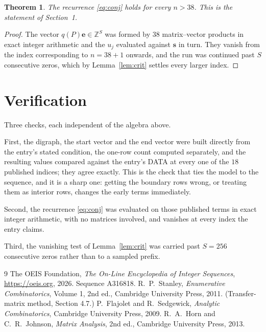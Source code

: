 \documentclass[11pt,a4paper]{article}
\theoremstyle{plain}
\newtheorem{theorem}{Theorem}
\theoremstyle{definition}
\begin{document}
\begin{theorem}
The recurrence \eqref{eq:conj} holds for every $n>38$. This is the statement of
Section~1.
\end{theorem}

\begin{proof}
The vector $q(P)\mathbf{e}\in\mathbb{Z}^{S}$ was formed by $38$ matrix--vector
products in exact integer arithmetic and the $u_j$ evaluated against $\mathbf{s}$ in turn.
They vanish from the index corresponding to $n=38+1$ onwards, and the run was continued
past $S$ consecutive zeros, which by Lemma~\ref{lem:crit} settles every larger index.
\end{proof}

\section{Verification}

Three checks, each independent of the algebra above.

First, the digraph, the start vector and the end vector were built directly from the
entry's stated condition, the one-row count computed separately, and the resulting values
compared against the entry's DATA at every one of the $18$ published indices; they
agree exactly. This is the check that ties the model to the sequence, and it is a sharp one:
getting the boundary rows wrong, or treating them as interior rows, changes the early terms
immediately.

Second, the recurrence \eqref{eq:conj} was evaluated on those published terms in exact
integer arithmetic, with no matrices involved, and vanishes at every index the entry claims.

Third, the vanishing test of Lemma~\ref{lem:crit} was carried past $S=256$ consecutive
zeros rather than to a sampled prefix.

\begin{thebibliography}{9}
 The OEIS Foundation, \emph{The On-Line Encyclopedia of Integer
Sequences}, \url{https://oeis.org}, 2026. Sequence A316818.
 R.~P.~Stanley, \emph{Enumerative Combinatorics}, Volume 1, 2nd ed.,
Cambridge University Press, 2011. (Transfer-matrix method, Section 4.7.)
 P.~Flajolet and R.~Sedgewick, \emph{Analytic Combinatorics}, Cambridge
University Press, 2009.
 R.~A.~Horn and C.~R.~Johnson, \emph{Matrix Analysis}, 2nd ed., Cambridge
University Press, 2013.
\end{thebibliography}
\end{document}
